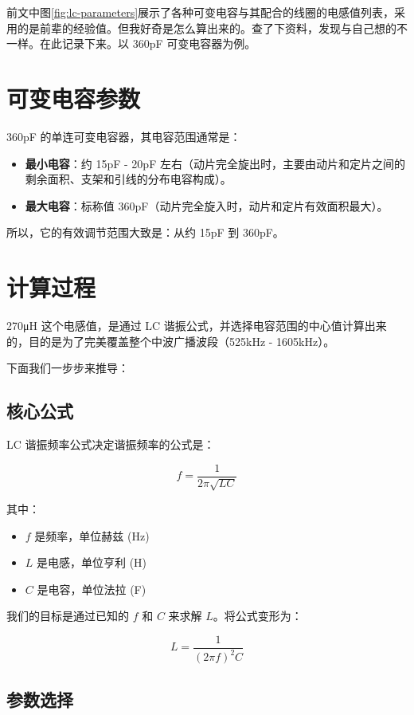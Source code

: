\documentclass[12pt,UTF8]{ctexbook}
\begin{document}
前文中图\ref{fig:lc-parameters}展示了各种可变电容与其配合的线圈的电感值列表，采用的是前辈的经验值。但我好奇是怎么算出来的。查了下资料，发现与自己想的不一样。在此记录下来。以 360pF 可变电容器为例。

\section{可变电容参数}

360pF 的单连可变电容器，其电容范围通常是：

\begin{itemize}[leftmargin=2cm]
	\item \textbf{最小电容}：约 15pF - 20pF 左右（动片完全旋出时，主要由动片和定片之间的剩余面积、支架和引线的分布电容构成）。
	\item \textbf{最大电容}：标称值 360pF（动片完全旋入时，动片和定片有效面积最大）。
\end{itemize}

所以，它的有效调节范围大致是：从约 15pF 到 360pF。

\section{计算过程}

270μH 这个电感值，是通过 LC 谐振公式，并选择电容范围的中心值计算出来的，目的是为了完美覆盖整个中波广播波段（525kHz - 1605kHz）。

下面我们一步步来推导：

\subsection{核心公式}

LC 谐振频率公式决定谐振频率的公式是：

\[ f = \frac{1}{2\pi\sqrt{LC}} \]

其中：

\begin{itemize}[leftmargin=2cm]
	\item \( f \) 是频率，单位赫兹 (Hz)
	\item \( L \) 是电感，单位亨利 (H)
	\item \( C \) 是电容，单位法拉 (F)
\end{itemize}

我们的目标是通过已知的 \( f \) 和 \( C \) 来求解 \( L \)。将公式变形为：

\[ L = \frac{1}{(2\pi f)^2 C} \]

\subsection{参数选择}
\end{document}
